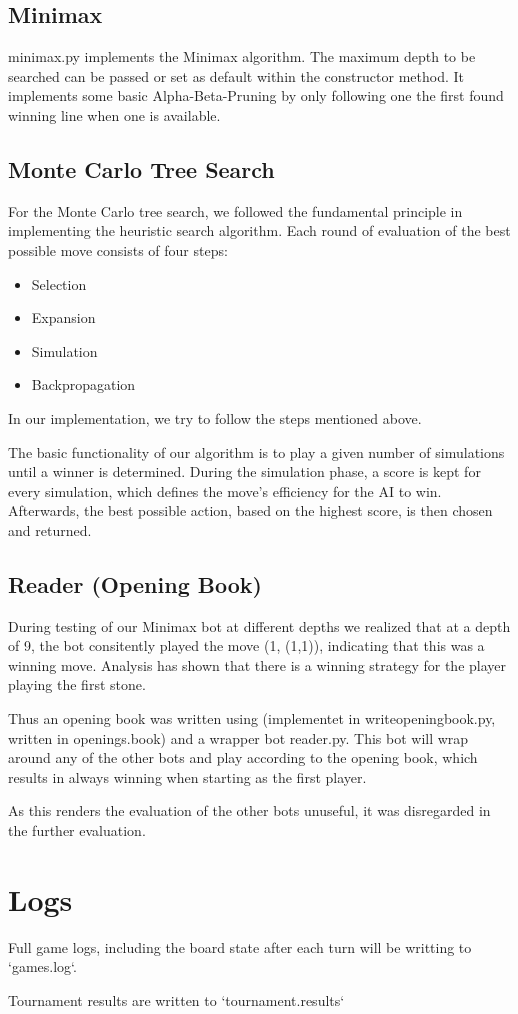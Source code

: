 \subsection{Minimax}
minimax.py implements the Minimax algorithm. The maximum depth to be searched can be passed or set as default within the constructor method.
It implements some basic Alpha-Beta-Pruning by only following one the first found winning line when one is available.

\subsection{Monte Carlo Tree Search}
For the Monte Carlo tree search, we followed the fundamental principle in implementing the heuristic search algorithm. Each round of evaluation of the best possible move consists of four steps:
\begin{itemize}
    \item Selection
    \item Expansion
    \item Simulation
    \item Backpropagation
\end{itemize}
In our implementation, we try to follow the steps mentioned above.

The basic functionality of our algorithm is to play a given number of simulations until a winner is determined. During the simulation phase, a score is kept for every simulation, which defines the move's efficiency for the AI to win. Afterwards, the best possible action, based on the highest score, is then chosen and returned.

\subsection{Reader (Opening Book)}

During testing of our Minimax bot at different depths we realized that at
a depth of 9, the bot consitently played the move (1, (1,1)), indicating that
this was a winning move. Analysis has shown that there is a winning strategy
for the player playing the first stone.

Thus an opening book was written using (implementet in writeopeningbook.py,
written in openings.book) and a wrapper bot reader.py. This bot will wrap around
any of the other bots and play according to the opening book, which results
in always winning when starting as the first player.

As this renders the evaluation of the other bots unuseful, it was disregarded in
the further evaluation.

\section{Logs}
Full game logs, including the board state after each turn will be writting to `games.log`.

Tournament results are written to `tournament.results`

